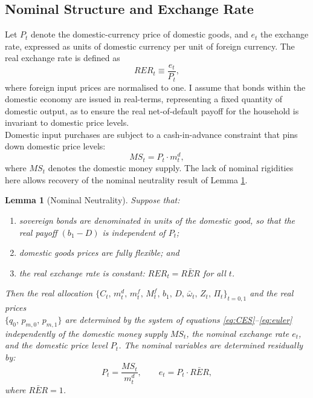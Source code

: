 \documentclass[11pt]{article}
\theoremstyle{definition}
\theoremstyle{plain}
\newtheorem{lemma}{Lemma}
\theoremstyle{remark}
\begin{document}
\newpage
\printbibliography
\newpage

\begin{appendices}

\section{Nominal Structure and Exchange Rate} \label{ap:nominal}
Let $P_t$ denote the domestic-currency price of domestic goods, and $e_t$ the exchange rate, expressed as units of domestic currency per unit of foreign currency. The real exchange rate is defined as
\begin{equation} \label{eq:real-exch}
    RER_t \equiv \frac{e_t}{P_t},
\end{equation}
where foreign input prices are normalised to one. I assume that bonds within the domestic economy are issued in real-terms, representing a fixed quantity of domestic output, as to ensure the real net-of-default payoff for the household is invariant to domestic price levels. \\

Domestic input purchases are subject to a cash-in-advance constraint that pins down domestic price levels:
\begin{equation} \label{eq:cash-in-advance}
    MS_t=P_t \cdot m^d_t,
\end{equation}
where $MS_t$ denotes the domestic money supply. The lack of nominal rigidities here allows recovery of the nominal neutrality result of Lemma \ref{lem:neutrality}.

\begin{lemma}[Nominal Neutrality]\label{lem:neutrality}
Suppose that:
\begin{enumerate}[label=(\roman*)]
    \item sovereign bonds are denominated in units of the domestic good, so that the real payoff $(b_1 - D)$ is independent of $P_t$;
    \item domestic goods prices are fully flexible; and
    \item the real exchange rate is constant: $RER_t = \bar{RER}$ for all $t$.
\end{enumerate}
Then the real allocation $\{C_t,\, m^d_t,\, m^f_t,\, M^f_t,\, b_1,\, D,\, \bar{\omega}_t,\, Z_t,\, \Pi_t\}_{t=0,1}$ and the real prices \\
$\{q_0,\, p_{m,0},\, p_{m,1}\}$ are determined by the system of equations \emph{\eqref{eq:CES}}--\emph{\eqref{eq:euler}}  independently of the domestic money supply $MS_t$, the nominal exchange rate $e_t$, and the domestic price level $P_t$. The nominal variables are determined residually by:
\begin{equation}\label{eq:price-level}
    P_t = \frac{MS_t}{m^d_t}, \qquad e_t = P_t \cdot \bar{RER},
\end{equation}
where $\bar{RER} = 1$.


\end{lemma}
\end{appendices}
\end{document}
